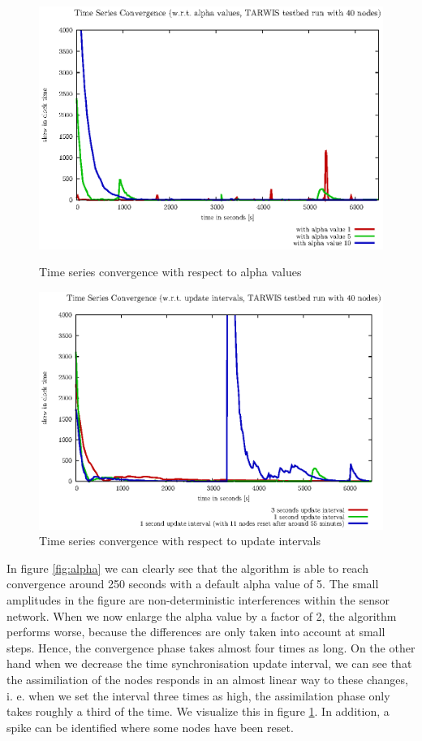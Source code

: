 \documentclass{llncs}
\begin{document}
\begin{figure}[h]
	\centering
	\includegraphics[scale=0.7]{images/FIG_01.eps}
	\caption{Time series convergence with respect to alpha values}
	\label{fig:alpha}
	\bigskip
	\bigskip
	\centering
	\includegraphics[scale=0.7]{images/FIG_02.eps}
	\caption{Time series convergence with respect to update intervals}
	\label{fig:update_intervals}
\end{figure}


\noindent In figure \ref{fig:alpha} we can clearly see that the algorithm is able to reach convergence around 250 seconds with a default alpha value of 5. The small amplitudes in the figure are non-deterministic interferences within the sensor network. When we now enlarge the alpha value by a factor of 2, the algorithm performs worse, because the differences are only taken into account at small steps. Hence, the convergence phase takes almost four times as long.
On the other hand when we decrease the time synchronisation update interval, we can see that the assimiliation of the nodes responds in an almost linear way to these changes, i. e. when we set the interval three times as high, the assimilation phase only takes roughly a third of the time. We visualize this in figure \ref{fig:update_intervals}. In addition, a spike can be identified where some nodes have been reset.\\
\end{document}
